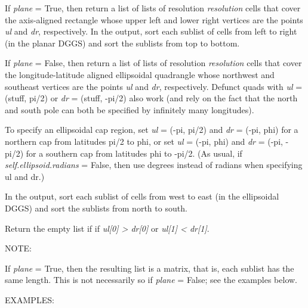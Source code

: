 \documentclass[a4paper,12ptopenany,oneside]{sphinxmanual}
\begin{document}
\begin{fulllineitems}
\begin{fulllineitems}
\end{fulllineitems}


\begin{fulllineitems}
\label{dggs:rhealpix_dggs.dggs.RHEALPixDGGS.cells_from_region}
If \emph{plane} = True, then return a list of lists of resolution 
\emph{resolution} cells that cover the axis-aligned rectangle whose 
upper left and lower right vertices are the points \emph{ul} and \emph{dr}, 
respectively.  
In the output, sort each sublist of cells from left to right (in the 
planar DGGS) and sort the sublists from top to bottom.

If \emph{plane} = False, then return a list of lists of resolution 
\emph{resolution} 
cells that cover the longitude-latitude aligned ellipsoidal quadrangle  
whose northwest and southeast vertices are the points \emph{ul} and \emph{dr}, 
respectively. Defunct quads with \emph{ul} = (stuff, pi/2) or 
\emph{dr} = (stuff, -pi/2) also work 
(and rely on the fact that the north and south pole can both 
be specified by infinitely many longitudes).

To specify an ellipsoidal cap region, set \emph{ul} = (-pi, pi/2) and 
\emph{dr} = (-pi, phi) for a northern cap from latitudes pi/2 to phi, or 
set \emph{ul} = (-pi, phi) and \emph{dr} = (-pi, -pi/2) for a southern cap from 
latitudes phi to -pi/2. (As usual, if \emph{self.ellipsoid.radians} = False, 
then use degrees instead of radians when specifying ul and dr.)

In the output, sort each sublist of cells from west to east (in the 
ellipsoidal DGGS) and sort the sublists from north to south.

Return the empty list if if \emph{ul{[}0{]} \textgreater{} dr{[}0{]}} or \emph{ul{[}1{]} \textless{} dr{[}1{]}}.

NOTE:

If \emph{plane} = True, then the resulting list is a matrix, that is,
each sublist has the same length.  This is not necessarily so if
\emph{plane} = False; see the examples below.

EXAMPLES:


\end{fulllineitems}
\end{fulllineitems}
\end{document}
